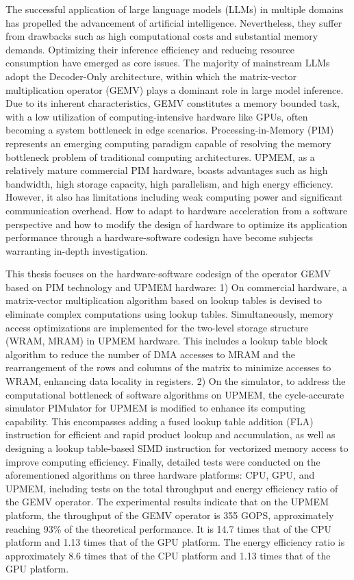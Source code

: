 \begin{abstracten}
The successful application of large language models (LLMs) in multiple domains has propelled the advancement of artificial intelligence. Nevertheless, they suffer from drawbacks such as high computational costs and substantial memory demands. Optimizing their inference efficiency and reducing resource consumption have emerged as core issues. The majority of mainstream LLMs adopt the Decoder-Only architecture, within which the matrix-vector multiplication operator (GEMV) plays a dominant role in large model inference. Due to its inherent characteristics, GEMV constitutes a memory bounded task, with a low utilization of computing-intensive hardware like GPUs, often becoming a system bottleneck in edge scenarios. Processing-in-Memory (PIM) represents an emerging computing paradigm capable of resolving the memory bottleneck problem of traditional computing architectures. UPMEM, as a relatively mature commercial PIM hardware, boasts advantages such as high bandwidth, high storage capacity, high parallelism, and high energy efficiency. However, it also has limitations including weak computing power and significant communication overhead. How to adapt to hardware acceleration from a software perspective and how to modify the design of hardware to optimize its application performance through a hardware-software codesign have become subjects warranting in-depth investigation.

This thesis focuses on the hardware-software codesign of the operator GEMV based on PIM technology and UPMEM hardware: 1) On commercial hardware, a matrix-vector multiplication algorithm based on lookup tables is devised to eliminate complex computations using lookup tables. Simultaneously, memory access optimizations are implemented for the two-level storage structure (WRAM, MRAM) in UPMEM hardware. This includes a lookup table block algorithm to reduce the number of DMA accesses to MRAM and the rearrangement of the rows and columns of the matrix to minimize accesses to WRAM, enhancing data locality in registers. 2) On the simulator, to address the computational bottleneck of software algorithms on UPMEM, the cycle-accurate simulator PIMulator for UPMEM is modified to enhance its computing capability. This encompasses adding a fused lookup table addition (FLA) instruction for efficient and rapid product lookup and accumulation, as well as designing a lookup table-based SIMD instruction for vectorized memory access to improve computing efficiency. Finally, detailed tests were conducted on the aforementioned algorithms on three hardware platforms: CPU, GPU, and UPMEM, including tests on the total throughput and energy efficiency ratio of the GEMV operator. The experimental results indicate that on the UPMEM platform, the throughput of the GEMV operator is 355 GOPS, approximately reaching 93\% of the theoretical performance. It is 14.7 times that of the CPU platform and 1.13 times that of the GPU platform. The energy efficiency ratio is approximately 8.6 times that of the CPU platform and 1.13 times that of the GPU platform. 
\end{abstracten}
